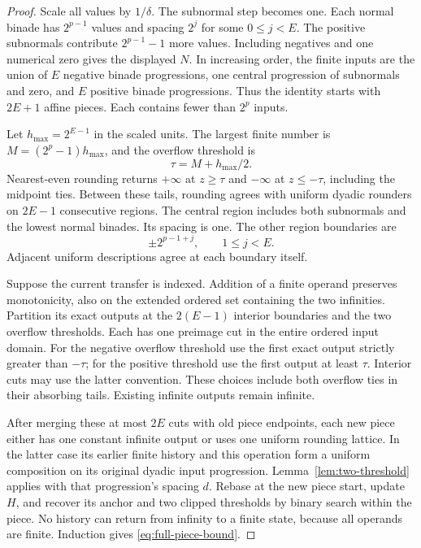 \documentclass[11pt,reqno]{amsart}
\theoremstyle{definition}
\theoremstyle{remark}
\numberwithin{equation}{section}
\begin{document}
\begin{proof}
Scale all values by $1/\delta$. The subnormal step becomes one. Each
normal binade has $2^{p-1}$ values and spacing $2^j$ for some
$0\leq j<E$. The positive subnormals contribute $2^{p-1}-1$ more values.
Including negatives and one numerical zero gives the displayed $N$.
In increasing order, the finite inputs are the union of $E$ negative
binade progressions, one central progression of subnormals and zero,
and $E$ positive binade progressions. Thus the identity starts with
$2E+1$ affine pieces. Each contains fewer than $2^p$ inputs.

Let $h_{\max}=2^{E-1}$ in the scaled units. The largest finite number
is $M=(2^p-1)h_{\max}$, and the overflow threshold is
\[
 \tau=M+h_{\max}/2.
\]
Nearest-even rounding returns $+\infty$ at $z\geq\tau$ and $-\infty$
at $z\leq-\tau$, including the midpoint ties. Between these tails,
rounding agrees with uniform dyadic rounders on $2E-1$ consecutive
regions. The central region includes both subnormals and the lowest
normal binades. Its spacing is one. The other region boundaries are
\[
 \pm2^{p-1+j},\qquad 1\leq j<E.
\]
Adjacent uniform descriptions agree at each boundary itself.

Suppose the current transfer is indexed. Addition of a finite operand
preserves monotonicity, also on the extended ordered set containing the
two infinities. Partition its exact outputs at the $2(E-1)$ interior
boundaries and the two overflow thresholds. Each has one preimage cut
in the entire ordered input domain. For the negative overflow threshold
use the first exact output strictly greater than $-\tau$; for the
positive threshold use the first output at least $\tau$. Interior cuts
may use the latter convention. These choices include both overflow ties
in their absorbing tails. Existing infinite outputs remain infinite.

After merging these at most $2E$ cuts with old piece endpoints, each new
piece either has one constant infinite output or uses one uniform
rounding lattice. In the latter case its earlier finite history and this
operation form a uniform composition on its original dyadic input
progression. Lemma~\ref{lem:two-threshold} applies with that progression's
spacing $d$. Rebase at the new piece start, update $H$, and recover its
anchor and two clipped thresholds by binary search within the piece.
No history can return from infinity to a finite state, because all
operands are finite. Induction gives \eqref{eq:full-piece-bound}.


\end{proof}
\end{document}
